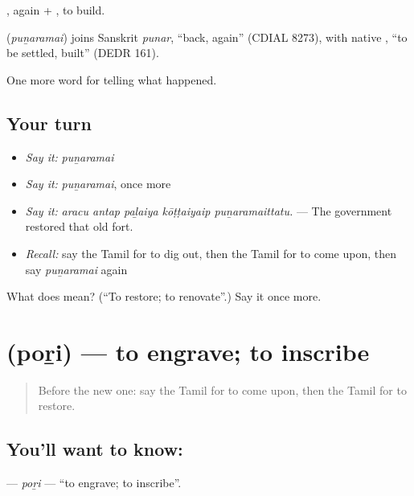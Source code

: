 , again + , to build.

\begin{cousinweb}
\textbf{} (\emph{puṉaramai}) joins Sanskrit \emph{punar}, \textquotedblleft{}back, again\textquotedblright{} (CDIAL 8273), with native , \textquotedblleft{}to be settled, built\textquotedblright{} (DEDR 161).
\end{cousinweb}

\begin{grammarlens}[title={What you've built}]
One more word for telling what happened.
\end{grammarlens}

\subsection*{Your turn}
\begin{itemize}
\raggedright
  \item \emph{Say it:} \emph{puṉaramai}
  \item \emph{Say it:} \emph{puṉaramai}, once more
  \item \emph{Say it:} \emph{aracu antap paḻaiya kōṭṭaiyaip puṉaramaittatu.} — The government restored that old fort.
  \item \emph{Recall:} say the Tamil for to dig out, then the Tamil for to come upon, then say \emph{puṉaramai} again
\end{itemize}

\begin{tcolorbox}[breakable,colback=teal!4,colframe=teal!35!black,title={Before you move on}]
What does  mean? (\textquotedblleft{}To restore; to renovate\textquotedblright{}.) Say it once more.
\end{tcolorbox}
\section[\texorpdfstring{\ta{பொறி} (poṟi)}{பொறி (poṟi)}]{ (poṟi) — to engrave; to inscribe}

\label{lesson:TA-C342-pori-engrave}



\begin{quote}
Before the new one: say the Tamil for to come upon, then the Tamil for to restore.
\end{quote}

\subsection*{You'll want to know: }
\textbf{} — \emph{poṟi} — \textquotedblleft{}to engrave; to inscribe\textquotedblright{}.

